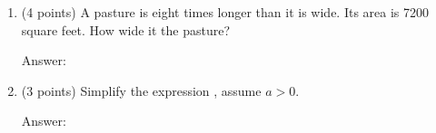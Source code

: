 \documentclass[11pt]{article}
\begin{document}
\begin{enumerate}
\vfill
\item (4 points) A pasture is eight times longer than it is wide. Its area is 7200 square feet. How wide it the pasture?\\
\begin{flushright}{Answer: \underline{\hspace{2in}}}\end{flushright}

\vfill
\item (3 points) Simplify  the expression , assume $a>0.$
\begin{flushright}{Answer: \underline{\hspace{2in}}}\end{flushright}

\vfill
\end{enumerate}
\end{document}
